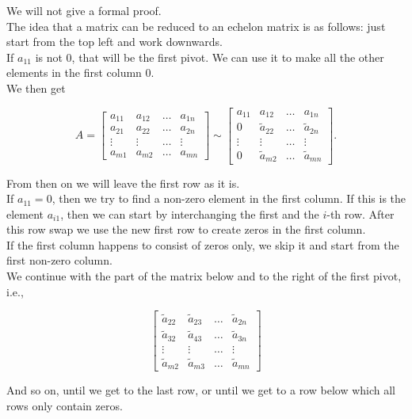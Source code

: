 \begin{rem}
We will not give a formal proof. \\
The idea that a matrix can be reduced to an echelon matrix is as follows: just start from the top left and work downwards.  \\
If $a_{11}$ is not 0, that will be the first pivot. We can use it to make all the other elements in the first column 0.\\
We then get

$$

    A =  \left[
\begin{array}{cccc}
            a_{11} & a_{12}&  \ldots&   a_{1n} \\
            a_{21} & a_{22}&  \ldots&   a_{2n} \\
            \vdots &  \vdots&  \ldots&  \vdots    \\
            a_{m1} & a_{m2}&  \ldots&   a_{mn}
          \end{array}
   \right] \sim  \left[
\begin{array}{cccc}
            a_{11} & a_{12}&  \ldots&   a_{1n} \\
                0  & \tilde{a}_{22}&  \ldots&   \tilde{a}_{2n} \\
            \vdots &  \vdots&  \ldots&  \vdots    \\
            0 & \tilde{a}_{m2}&  \ldots&   \tilde{a}_{mn}
          \end{array}
   \right].
$$

From then on we will leave the first row as it is. \\
If $a_{11} = 0$, then we try to find a  non-zero element in the first column.  If  this is the element  $a_{i1}$, then we can start by interchanging the first and the $i$-th row. After this row swap we use the new first row to create zeros in the first column.\\
If the first column happens to consist of zeros only, we skip it and start from the first non-zero column. \\

We continue with the part of the matrix below and to the right of the first pivot, i.e.,

$$

   \left[
\begin{array}{cccc} 
             \tilde{a}_{22}&  \tilde{a}_{23}&  \ldots&   \tilde{a}_{2n} \\
             \tilde{a}_{32}&   \tilde{a}_{43}& \ldots&   \tilde{a}_{3n} \\
                \vdots     &  \vdots         &  \ldots&  \vdots    \\
           \tilde{a}_{m2}&  \tilde{a}_{m3}&  \ldots&   \tilde{a}_{mn}
          \end{array}
   \right]
$$

And so on, until we get to the last row, or until we get to a row below which all rows only contain zeros.
\end{rem}


